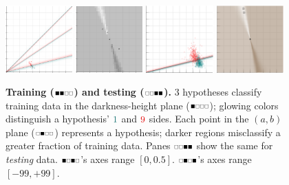 \documentclass[11pt, justified]{tufte-book}
\newcommand{\offourline}[1]{
    {\tiny \raisebox{0.04cm}{\scalebox{0.9}{$\substack{
        \IfSubStr{#1}{0}{{\blacksquare}}{\square}   
        \IfSubStr{#1}{1}{{\blacksquare}}{\square}
        \IfSubStr{#1}{2}{{\blacksquare}}{\square}   
        \IfSubStr{#1}{3}{{\blacksquare}}{\square}   
    }$}}}%
}
\theoremstyle{definition}
\begin{document}
        \begin{figure}[h]
            \centering
            \includegraphics[width=0.23\textwidth]{example-mnist/new-train.png}%
            \hspace{0.01\textwidth}%
            \includegraphics[width=0.23\textwidth]{example-mnist/new-train-scat.png}%
            \hspace{0.02\textwidth}%
            \includegraphics[width=0.23\textwidth]{example-mnist/test.png}%
            \hspace{0.01\textwidth}%
            \includegraphics[width=0.23\textwidth]{example-mnist/test-scat.png}
            \caption{
              \textbf{Training
              ($\protect\offourline{01}$) and testing
              ($\protect\offourline{23}$).}
              $3$ hypotheses classify training data in the darkness-height
              plane ($\protect\offourline{0}$); glowing colors distinguish a
              hypothesis' $\cya{1}$ and $\red{9}$ sides.
              Each point in the $(a,b)$ plane ($\protect\offourline{1}$)
              represents a hypothesis; darker regions misclassify a greater
              fraction of training data.
              Panes $\protect\offourline{23}$ show the same for
              \emph{testing} data.
              $\protect\offourline{02}$'s axes range $[0, 0.5]$.
              $\protect\offourline{13}$'s axes range $[-99,+99]$. 
            }
            \label{fig:train-test-digits}
        \end{figure}
\end{document}
